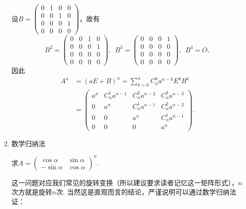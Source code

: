 \begin{enumerate}
          \begin{solution}
              设$B=\begin{pmatrix}
                      0 & 1 & 0 & 0 \\ 0 & 0 & 1 & 0 \\ 0 & 0 & 0 & 1 \\ 0 & 0 & 0 & 0
                  \end{pmatrix}$，故有
              \[B^2=\begin{pmatrix}
                      0 & 0 & 1 & 0 \\ 0 & 0 & 0 & 1 \\ 0 & 0 & 0 & 0 \\ 0 & 0 & 0 & 0
                  \end{pmatrix},\enspace B^3=\begin{pmatrix}
                      0 & 0 & 0 & 1 \\ 0 & 0 & 0 & 0 \\ 0 & 0 & 0 & 0 \\ 0 & 0 & 0 & 0
                  \end{pmatrix},\enspace B^4=O,\]
              因此
              \begin{align*}
                  A^n & =(aE+B)^n=\sum\limits_{k=0}^nC_n^ka^{n-k}E^kB^k   \\
                      & =\begin{pmatrix}
                             a^n & C_n^1a^{n-1} & C_n^2a^{n-2} & C_n^3a^{n-3} \\
                             0   & a^n          & C_n^1a^{n-1} & C_n^2a^{n-2} \\
                             0   & 0            & a^n          & C_n^1a^{n-1} \\
                             0   & 0            & 0            & a^n
                         \end{pmatrix}.
              \end{align*}
          \end{solution}

    \item 数学归纳法
          \begin{example}{}{}
              求$A=\begin{pmatrix}\cos\alpha & \sin\alpha \\ -\sin\alpha & \cos\alpha\end{pmatrix}^n$.
          \end{example}
          这一问题对应我们常见的旋转变换（所以建议要求读者记忆这一矩阵形式），$n$次方就是旋转$n$次. 当然这是直观而言的结论，严谨说明可以通过数学归纳法证：


\end{enumerate}
